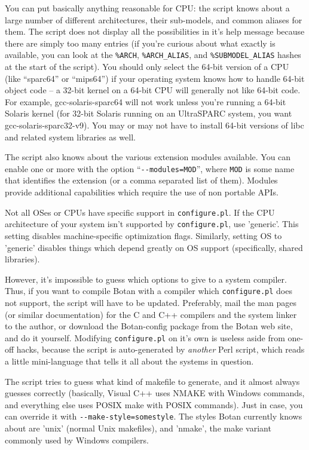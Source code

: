 \documentclass{article}
\newcommand{\filename}[1]{\texttt{#1}}
\begin{document}
You can put basically anything reasonable for CPU: the script knows about a
large number of different architectures, their sub-models, and common aliases
for them. The script does not display all the possibilities in it's help
message because there are simply too many entries (if you're curious about what
exactly is available, you can look at the \verb|%ARCH|, \verb|%ARCH_ALIAS|, and
\verb|%SUBMODEL_ALIAS| hashes at the start of the script). You should only
select the 64-bit version of a CPU (like ``sparc64'' or ``mips64'') if your
operating system knows how to handle 64-bit object code -- a 32-bit kernel on a
64-bit CPU will generally not like 64-bit code. For example,
gcc-solaris-sparc64 will not work unless you're running a 64-bit Solaris kernel
(for 32-bit Solaris running on an UltraSPARC system, you want
gcc-solaris-sparc32-v9). You may or may not have to install 64-bit versions of
libc and related system libraries as well.

The script also knows about the various extension modules available. You can
enable one or more with the option ``\verb|--modules=MOD|'', where \verb|MOD|
is some name that identifies the extension (or a comma separated list of
them). Modules provide additional capabilities which require the use of non
portable APIs.

Not all OSes or CPUs have specific support in \filename{configure.pl}. If the
CPU architecture of your system isn't supported by \filename{configure.pl}, use
'generic'. This setting disables machine-specific optimization
flags. Similarly, setting OS to 'generic' disables things which depend greatly
on OS support (specifically, shared libraries).

However, it's impossible to guess which options to give to a system compiler.
Thus, if you want to compile Botan with a compiler which
\filename{configure.pl} does not support, the script will have to be updated.
Preferably, mail the man pages (or similar documentation) for the C and C++
compilers and the system linker to the author, or download the Botan-config
package from the Botan web site, and do it yourself. Modifying
\filename{configure.pl} on it's own is useless aside from one-off hacks,
because the script is auto-generated by \emph{another} Perl script, which reads
a little mini-language that tells it all about the systems in question.

The script tries to guess what kind of makefile to generate, and it almost
always guesses correctly (basically, Visual C++ uses NMAKE with Windows
commands, and everything else uses POSIX make with POSIX commands). Just in
case, you can override it with \verb|--make-style=somestyle|. The styles Botan
currently knows about are 'unix' (normal Unix makefiles), and 'nmake', the make
variant commonly used by Windows compilers.
\end{document}
